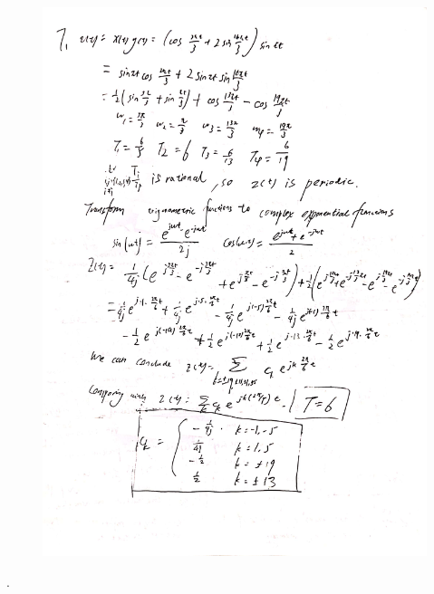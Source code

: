 \documentclass[a4paper]{article}
\begin{document}
\begin{figure}[H]
  \begin{center}
    \includegraphics[width=1\textwidth]{7.jpg}
  \end{center}
\end{figure}
.
\end{document}

